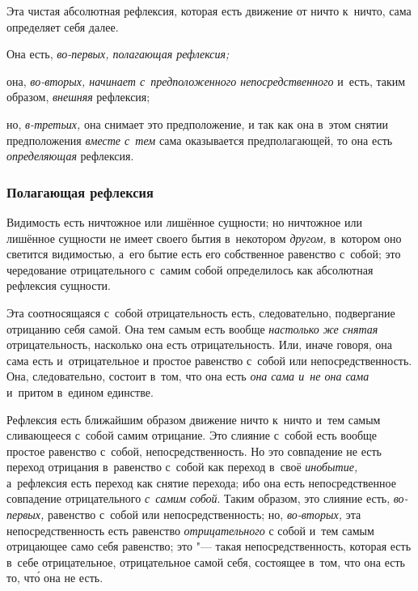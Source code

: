 Эта чистая абсолютная рефлексия, которая есть движение от ничто к~ничто,
сама определяет себя далее.

Она есть, {\em во-первых, полагающая рефлексия;}

она, {\em во-вторых, начинает с~предположенного непосредственного} и~есть,
таким образом, {\em внешняя} рефлексия;

но, {\em в-третьих,} она снимает это предположение, и
так как она в~этом снятии предположения {\em вместе с~тем}
сама оказывается предполагающей, то она есть {\em определяющая} рефлексия.

\subsubsection{Полагающая рефлексия}
Видимость есть ничтожное или лишённое сущности;
но ничтожное или лишённое сущности не имеет своего бытия в~некотором
{\em другом,} в~котором оно светится видимостью, а~его
бытие есть его собственное равенство с~собой; это чередование
отрицательного с~самим собой определилось как абсолютная рефлексия сущности.

Эта соотносящаяся с~собой отрицательность есть, следовательно, подвергание
отрицанию себя самой. Она тем самым есть вообще
{\em настолько же снятая} отрицательность, насколько
она есть отрицательность. Или, иначе говоря, она сама есть и~отрицательное
и простое равенство с~собой или непосредственность. Она, следовательно,
состоит в~том, что она есть {\em она сама и~не она
сама} и~притом в~едином единстве.

Рефлексия есть ближайшим образом движение ничто к~ничто и~тем самым
сливающееся с~собой самим отрицание. Это слияние с~собой есть вообще
простое равенство с~собой, непосредственность. Но это совпадение не есть
переход отрицания в~равенство с~собой как переход в~своё
{\em инобытие,} а~рефлексия есть переход как снятие
перехода; ибо она есть непосредственное совпадение отрицательного
{\em с~самим собой}. Таким образом, это слияние есть,
{\em во-первых,} равенство с~собой или
непосредственность; но, {\em во-вторых,} эта
непосредственность есть равенство {\em отрицательного}
с собой и~тем самым отрицающее само себя равенство; это "--- такая
непосредственность, которая есть в~себе отрицательное, отрицательное самой
себя, состоящее в~том, что она есть то, чт\'{о} она не есть.

